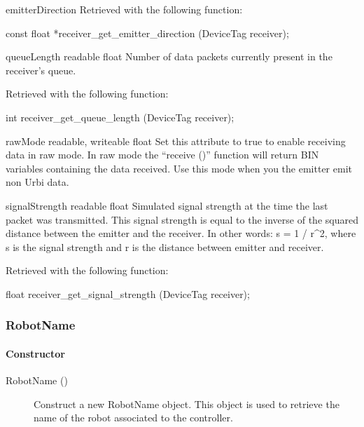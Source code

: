 \begin{itemize}
\begin{attribute}{emitterDirection}
  Retrieved with the following \webots function:
\begin{cxx}
const float *receiver_get_emitter_direction  (DeviceTag receiver);
\end{cxx}
\end{attribute}

\begin{attribute}{queueLength}
  {readable}
  {float}
  {}
  Number of data packets currently present in the
  receiver's queue.

  Retrieved with the following \webots function:
\begin{cxx}
int receiver_get_queue_length  (DeviceTag receiver);
\end{cxx}
\end{attribute}

\begin{attribute}{rawMode}
  {readable, writeable}
  {float}
  {}
  Set this attribute to true to enable receiving data in
  raw mode.  In raw mode the ``receive ()'' function will return BIN
  variables containing the data received. Use this mode when you the
  emitter emit non Urbi data.
\end{attribute}

\begin{attribute}{signalStrength}
  {readable}
  {float}
  {}
  Simulated signal strength at the time the last packet
  was transmitted.  This signal strength is equal to the inverse of the
  squared distance between the emitter and the receiver. In other
  words: s = 1 / r\^{}2, where s is the signal strength and r is the
  distance between emitter and receiver.

  Retrieved with the following \webots function:
\begin{cxx}
float receiver_get_signal_strength  (DeviceTag receiver);
\end{cxx}
\end{attribute}
\end{itemize}

\subsubsection{RobotName}

\paragraph{Constructor}

\noindent
\begin{description}
\item[{RobotName ()}] Construct a new RobotName object. This object is
  used to retrieve the name of the robot associated to the \urbi
  controller.
\end{description}

